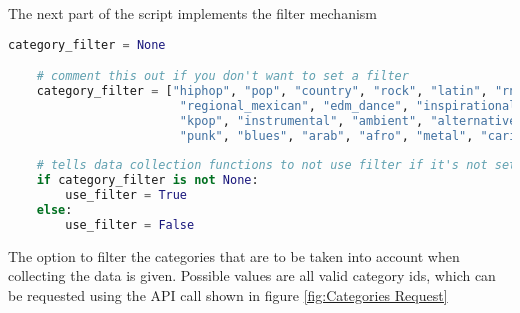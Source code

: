 The next part of the script implements the filter mechanism

\begin{lstlisting}[language=Python]
    category_filter = None

    # comment this out if you don't want to set a filter
    category_filter = ["hiphop", "pop", "country", "rock", "latin", "rnb", "mood", "indie_alt",
                        "regional_mexican", "edm_dance", "inspirational", "chill", "party", "roots",
                        "kpop", "instrumental", "ambient", "alternative", "classical", "jazz", "soul",
                        "punk", "blues", "arab", "afro", "metal", "caribbean", "funk"]
    
    # tells data collection functions to not use filter if it's not set
    if category_filter is not None:
        use_filter = True
    else:
        use_filter = False
\end{lstlisting} 

The option to filter the categories that are to be taken into account when collecting the data is given.
Possible values are all valid category ids, which can be requested using the API call shown in figure \ref{fig:Categories Request}


